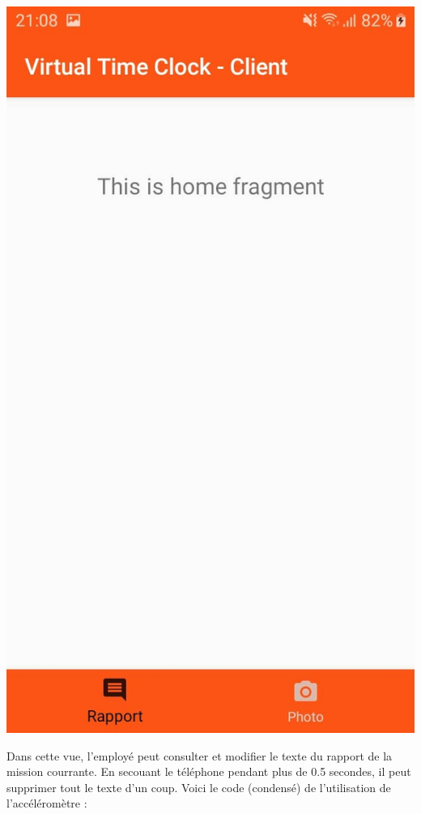 \documentclass{article}
\begin{document}
\begin{center}
  \includegraphics[scale=0.15]{texteAnd.jpg}
\end{center}

Dans cette vue, l'employé peut consulter et modifier le texte du rapport de la mission courrante. En secouant le téléphone pendant plus de 0.5 secondes, il peut supprimer tout le texte d'un coup.
Voici le code (condensé) de l'utilisation de l'accéléromètre : 
\end{document}
